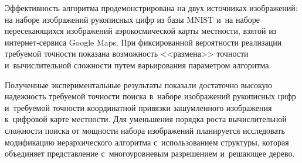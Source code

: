 \begin{multicols}{2}
Эффективность 
алгоритма продемонстрирована на двух источниках изображений: на наборе 
изображений рукописных цифр из базы MNIST и~на наборе пересекающихся 
изображений аэрокосмической карты местности, взятой из  
ин\-тер\-нет-сер\-ви\-са Google Maps. При фиксированной вероят\-ности 
реализации требуемой точности показана возможность <<размена>> точности 
и~вы\-чис\-ли\-тельной слож\-ности путем варьирования па\-ра\-мет\-ром алгоритма. 
{

}

Полученные экспериментальные результаты показали достаточно высокую 
надежность требуемой точности поиска в~наборе изображений рукописных 
цифр и~требуемой точности координатной привязки зашумленного 
изоб\-ра\-же\-ния к~цифровой карте местности. Для уменьшения порядка роста 
вычислительной сложности поиска от мощности набора изображений 
планируется исследовать модификацию иерархического алгоритма 
с~использованием структуры, которая объединяет представление 
с~многоуровневым разрешением и~решающее дерево.


\end{multicols}
